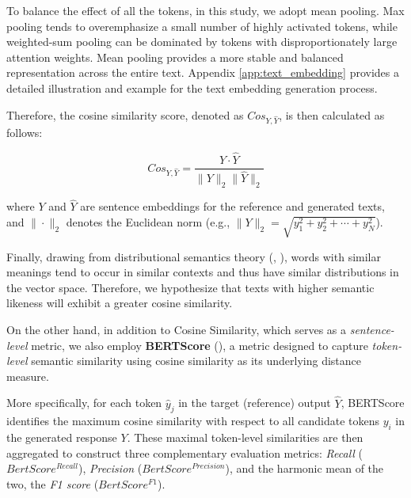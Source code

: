 
 
To balance the effect of all the tokens, in this study, we adopt mean pooling. Max pooling tends to overemphasize a small number of highly activated tokens, while weighted-sum pooling can be dominated by tokens with disproportionately large attention weights. Mean pooling provides a more stable and balanced representation across the entire text. Appendix \ref{app:text_embedding} provides a detailed illustration and example for the text embedding generation process. 


Therefore, the cosine similarity score, denoted as $Cos_{Y, \hat{Y}}$, is then calculated as follows:


\begin{equation*}
    Cos_{Y, \hat{Y}} = \frac{Y \cdot \hat{Y}}{\|Y\|_2 \|\hat{Y}\|_2}
\end{equation*}


where $Y$ and $\hat{Y}$ are sentence embeddings for the reference and generated texts, and $\|\cdot\|_2$ denotes the Euclidean norm (e.g., $\|Y\|_2=\sqrt{y_1^2+y_2^2+\cdots+y_N^2}$).


Finally, drawing from distributional semantics theory (\cite{firth1957linguistics}, \cite{sahlgren2008distributional}), words with similar meanings tend to occur in similar contexts and thus have similar distributions in the vector space. Therefore, we hypothesize that texts with higher semantic likeness will exhibit a greater cosine similarity. 



On the other hand, in addition to Cosine Similarity, which serves as a \textit{sentence-level} metric, we also employ \textbf{BERTScore} (\cite{zhang2019bertscore}), a metric designed to capture \textit{token-level} semantic similarity using cosine similarity as its underlying distance measure.

More specifically, for each token $\hat{y}_j$ in the target (reference) output $\hat{Y}$, BERTScore identifies the maximum cosine similarity with respect to all candidate tokens $y_i$ in the generated response $Y$. These maximal token-level similarities are then aggregated to construct three complementary evaluation metrics: \textit{Recall} ($BertScore^{Recall}$), \textit{Precision} ($BertScore^{Precision}$), and the harmonic mean of the two, the \textit{F1 score} ($BertScore^{F1}$).


